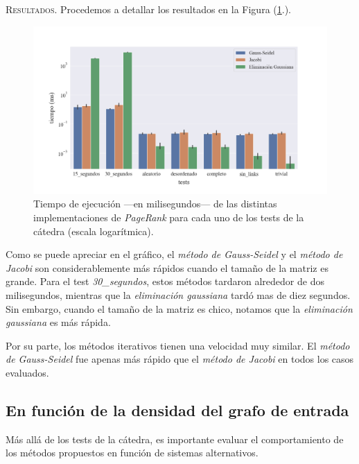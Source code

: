 \vspace{1.5em}
\noindent \textsc{Resultados}. Procedemos a detallar los resultados en la Figura (\ref{tiempo_ej}.). 

\begin{figure}[!htbp]
    \centering
    \includegraphics[width=.9\textwidth, trim=0 30 0 30]{files/src/.media/tiempo-ejecucion.png}
    \caption{Tiempo de ejecución ---en milisegundos--- de las distintas implementaciones de \textit{PageRank} para cada uno de los tests de la cátedra (escala logarítmica).} \label{tiempo_ej}
\end{figure}


\vspace{1em}
Como se puede apreciar en el gráfico, el \textit{método de Gauss-Seidel} y el \textit{método de Jacobi} son considerablemente más rápidos cuando el tamaño de la matriz es grande. Para el test \textit{30\_segundos}, estos métodos tardaron alrededor de dos milisegundos, mientras que la \textit{eliminación gaussiana} tardó mas de diez segundos. Sin embargo, cuando el tamaño de la matriz es chico, notamos que la \textit{eliminación gaussiana} es más rápida. 

\vspace{1em}
Por su parte, los métodos iterativos tienen una velocidad muy similar. El \textit{método de Gauss-Seidel} fue apenas más rápido que el \textit{método de Jacobi} en todos los casos evaluados.





\vspace{2em}
\subsection{En función de la densidad del grafo de entrada}

Más allá de los tests de la cátedra, es importante evaluar el comportamiento de los métodos propuestos en función de sistemas alternativos.

